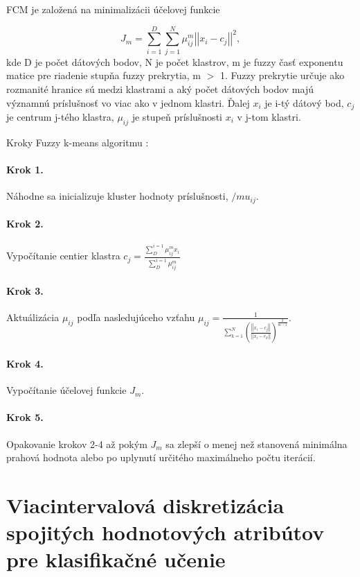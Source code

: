 FCM je založená na minimalizácii účelovej funkcie\cite{fuzzyLogicToolbox}

$$J_m = \sum_{i=1}^{D}\sum_{j=1}^{N} { \mu_{ij}^m \left| \left| x_i - c_j \right|\right|^2  },$$ 
kde 
D je počet dátových bodov, N je počet klastrov, m je fuzzy časť exponentu matice pre riadenie stupňa fuzzy prekrytia,  m $>$ 1. 
Fuzzy prekrytie určuje ako rozmanité hranice sú medzi klastrami a aký počet dátových bodov majú významnú príslušnosť vo viac ako v jednom klastri. 
Ďalej $x_i$ je i-tý dátový bod,  $c_j$ je centrum j-tého klastra, $\mu_{ij}$ je stupeň príslušnosti $x_i$ v j-tom klastri. 
 
Kroky Fuzzy k-means algoritmu : 
\paragraph{Krok 1.} Náhodne sa inicializuje kluster hodnoty príslušnosti, $/mu_{ij}$. 
\paragraph{Krok 2.} Vypočítanie centier klastra
$c_j = \frac{
\sum\limits_D^{i=1} \mu_{ij}^m x_i 
}{
\sum\limits_D^{i=1} \mu_{ij}^m
}$

\paragraph{Krok 3.} Aktuálizácia $\mu_{ij}$ podľa nasledujúceho vzťahu  
$\mu_{ij} = \frac{1}{\sum\limits_{k=1}^N  \left ( \frac {\left| \left| x_i - c_j \right|\right|}{\left| \left| x_i -c_k\right|\right|}\right) ^{\frac{2}{m-1}}}. $


\paragraph{Krok 4.} Vypočítanie účelovej funkcie $J_m$. 
\paragraph{Krok 5.} Opakovanie krokov 2-4 až pokým $J_m$ sa zlepší o menej než stanovená minimálna prahová hodnota alebo po uplynutí určitého maximálneho počtu iterácií. 





\section{Viacintervalová diskretizácia spojitých hodnotových atribútov pre klasifikačné učenie}

